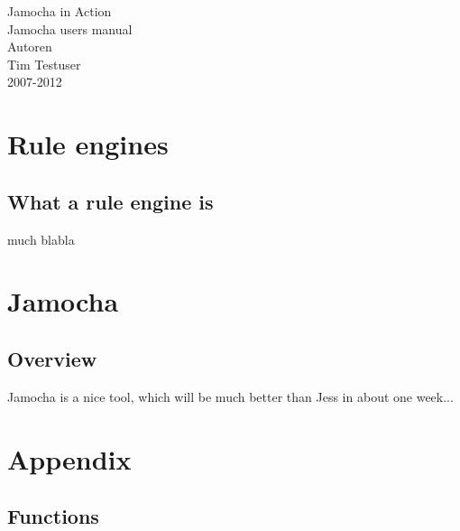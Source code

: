\documentclass[a4paper,12pt]{scrbook}
\begin{document}
\begin{titlepage}
\begin{center}
\vspace*{4cm}
\Huge Jamocha in Action\\
\vspace{1cm}
\large Jamocha users manual\\
\vspace{1cm}
\normalsize Autoren\\
Tim Testuser\\
\vspace{1cm}
2007-2012\\
\end{center}
\end{titlepage}

\tableofcontents
\newpage

\chapter{Rule engines}

\section{What a rule engine is}
much blabla

\chapter{Jamocha}

\section{Overview}
Jamocha is a nice tool, which will be much better than Jess in about one week...

\chapter{Appendix}

\section{Functions}

\end{document}
